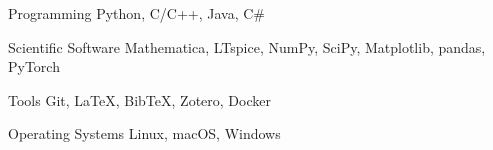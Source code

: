 

\begin{cvskills}


  \cvskill
  {Programming} %
  {Python, C/C++, Java, C\#} %

  \cvskill
  {Scientific Software} %
  {Mathematica, LTspice, NumPy, SciPy, Matplotlib, pandas, PyTorch} %

  \cvskill
  {Tools} %
  {Git, LaTeX, BibTeX, Zotero, Docker} %

  \cvskill
  {Operating Systems} %
  {Linux, macOS, Windows} %

\end{cvskills}
